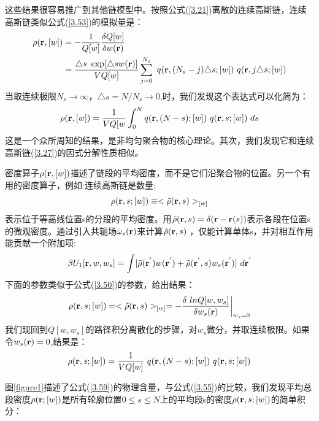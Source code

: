 这些结果很容易推广到其他链模型中。按照公式(\ref{3.21})离散的连续高斯链，连续高斯链类似公式(\ref{3.53})的模拟量是：
\begin{equation}\label{3.54}
\begin{aligned}
\rho(\mathbf{r},[w])&=-\frac{1}{Q[w]}\frac{\delta Q[w]}{\delta w(\mathbf{r})}\\ &=\frac{\triangle s ~\exp[\triangle sw(\mathbf{r})]}{VQ[w]}\sum_{j=0}^{N_s}~q(\mathbf{r},(N_s-j)\triangle s;[w])~q(\mathbf{r},j\triangle s;[w])
\end{aligned}
\end{equation}
当取连续极限$N_s\to \infty$，$\triangle s=N/N_s\to 0$,时，我们发现这个表达式可以化简为：
\begin{equation}\label{3.55}
\rho(\mathbf{r},[w])=\frac{1}{VQ[w}\int_{0}^{N}q(\mathbf{r},(N-s);[w])~q(\mathbf{r},s;[w])~ds
\end{equation}
这是一个众所周知的结果，是非均匀聚合物的核心理论。其次，我们发现它和连续高斯链(\ref{3.27})的因式分解性质相似。

密度算子$\rho(\mathbf{r},[w])$描述了链段的平均密度，而不是它们沿聚合物的位置。另一个有用的密度算子，例如:连续高斯链是数量:
\begin{equation}\label{3.56}
\rho(\mathbf{r},s;[w])\equiv <\tilde{\rho}(\mathbf{r},s)>_{[w]}
\end{equation}
表示位于等高线位置s的分段的平均密度。用$\tilde{\rho}(\mathbf{r},s)=\delta(\mathbf{r}-\mathbf{r}(s))$表示各段在位置s的微观密度。通过引入共轭场$\omega_s(\mathbf{r})$来计算$\tilde{\rho}(\mathbf{r},s)$
，仅能计算单体s，并对相互作用能贡献一个附加项:
\begin{equation}\label{3.57}
\beta U_1[\mathbf{r},w ,w_s]=\int [\tilde{\rho}(\mathbf{r}^{'})w (\mathbf{r}^{'})+\tilde{\rho}(\mathbf{r}^{'},s)w_s(\mathbf{r}^{'})]~d\mathbf{r}^{'}
\end{equation}
下面的参数类似于公式(\ref{3.50})的参数，给出结果：
\begin{equation}\label{3.58}
\rho(\mathbf{r},s;[w])=<\tilde{\rho}(\mathbf{r},s)>_{[w]}
=-\frac{\delta~lnQ[w,w_s]}{\delta w_s(\mathbf{r})} \bigg |_{w_s=0}
\end{equation}
我们现回到$Q[w,w_s]$的路径积分离散化的步骤，对$w_s$微分，并取连续极限。如果令$w_s(\mathbf{r})=0$,结果是：
\begin{equation}\label{3.59}
\rho(\mathbf{r},s;[w])=\frac{1}{VQ[w]}~q(\mathbf{r},(N-s);[w])~q(\mathbf{r},s;[w])
\end{equation}

图\ref{figure1}描述了公式(\ref{3.59})的物理含量，与公式(\ref{3.55})的比较，我们发现平均总段密度$\rho(\mathbf{r};[w])$是所有轮廓位置$0\le s\le N$上的平均段s的密度$\rho(\mathbf{r},s;[w])$的简单积分：

